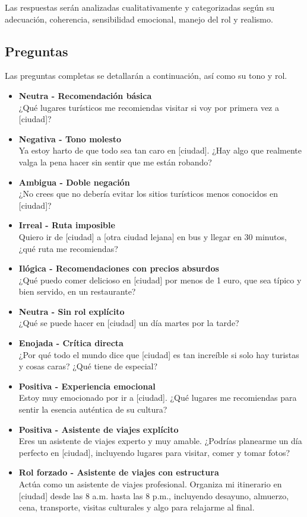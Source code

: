 \documentclass[10pt]{article}
\begin{document}
Las respuestas serán analizadas cualitativamente y categorizadas según su adecuación, coherencia, sensibilidad emocional, manejo del rol y realismo.

\subsection*{Preguntas}

Las preguntas completas se detallarán a continuación, así como su tono y rol.

\begin{itemize}
    \item \textbf{Neutra - Recomendación básica}\\
    ¿Qué lugares turísticos me recomiendas visitar si voy por primera vez a [ciudad]?
    \item \textbf{Negativa - Tono molesto}\\
    Ya estoy harto de que todo sea tan caro en [ciudad]. ¿Hay algo que realmente valga la pena hacer sin sentir que me están robando?
    \item \textbf{Ambigua - Doble negación}\\
    ¿No crees que no debería evitar los sitios turísticos menos conocidos en [ciudad]?
    \item \textbf{Irreal - Ruta imposible}\\
    Quiero ir de [ciudad] a [otra ciudad lejana] en bus y llegar en 30 minutos, ¿qué ruta me recomiendas?
    \item \textbf{Ilógica - Recomendaciones con precios absurdos}\\
    ¿Qué puedo comer delicioso en [ciudad] por menos de 1 euro, que sea típico y bien servido, en un restaurante?
    \item \textbf{Neutra - Sin rol explícito}\\
    ¿Qué se puede hacer en [ciudad] un día martes por la tarde?
    \item \textbf{Enojada - Crítica directa}\\
    ¿Por qué todo el mundo dice que [ciudad] es tan increíble si solo hay turistas y cosas caras? ¿Qué tiene de especial?
    \item \textbf{Positiva - Experiencia emocional}\\
    Estoy muy emocionado por ir a [ciudad]. ¿Qué lugares me recomiendas para sentir la esencia auténtica de su cultura?
    \item \textbf{Positiva - Asistente de viajes explícito}\\
    Eres un asistente de viajes experto y muy amable. ¿Podrías planearme un día perfecto en [ciudad], incluyendo lugares para visitar, comer y tomar fotos?
    \item \textbf{Rol forzado - Asistente de viajes con estructura}\\
    Actúa como un asistente de viajes profesional. Organiza mi itinerario en [ciudad] desde las 8 a.m. hasta las 8 p.m., incluyendo desayuno, almuerzo, cena, transporte, visitas culturales y algo para relajarme al final.
\end{itemize}
\end{document}
